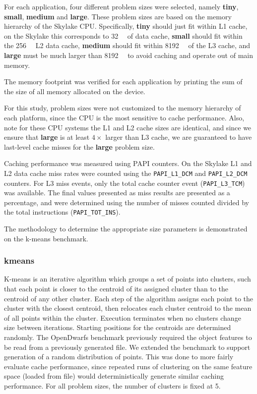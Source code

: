 \documentclass[../document.tex]{subfiles}
\begin{document}
\label{ssec:setting_sizes}

For each application, four different problem sizes were selected, namely {\bf tiny}, {\bf small}, {\bf medium} and {\bf large}.
These problem sizes are based on the memory hierarchy of the Skylake CPU.
Specifically, {\bf tiny} should just fit within L1 cache, on the Skylake this corresponds to \SI{32}{\kibi\byte} of data cache, {\bf small} should fit within the \SI{256}{\kibi\byte} L2 data cache, {\bf medium} should fit within \SI{8192}{\kibi\byte} of the L3 cache, and {\bf large} must be much larger than \SI{8192}{\kibi\byte} to avoid caching and operate out of main memory.

The memory footprint was verified for each application by printing the sum of the size of all memory allocated on the device.

For this study, problem sizes were not customized to the memory hierarchy of each platform, since the CPU is the most sensitive to cache performance.
Also, note for these CPU systems the L1 and L2 cache sizes are identical, and since we ensure that {\bf large} is at least $4\times$ larger than L3 cache, we are guaranteed to have last-level cache misses for the {\bf large} problem size.

Caching performance was measured using PAPI counters.
On the Skylake L1 and L2 data cache miss rates were counted using the {\tt PAPI\_L1\_DCM} and {\tt PAPI\_L2\_DCM} counters.
For L3 miss events, only the total cache counter event ({\tt PAPI\_L3\_TCM}) was available.
The final values presented as miss results are presented as a percentage, and were determined using the number of misses counted divided by the total instructions ({\tt PAPI\_TOT\_INS}).


The methodology to determine the appropriate size parameters is demonstrated on the k-means benchmark.

\subsubsection{kmeans}
K-means is an iterative algorithm which groups a set of points into clusters, such that each point is closer to the centroid of its assigned cluster than to the centroid of any other cluster.
Each step of the algorithm assigns each point to the cluster with the closest centroid, then relocates each cluster centroid to the mean of all points within the cluster.
Execution terminates when no clusters change size between iterations.
Starting positions for the centroids are determined randomly.
The OpenDwarfs benchmark previously required the object features to be read from a previously generated file.
We extended the benchmark to support generation of a random distribution of points.
This was done to more fairly evaluate cache performance, since repeated runs of clustering on the same feature space (loaded from file) would deterministically generate similar caching performance.
For all problem sizes, the number of clusters is fixed at 5.
\end{document}
